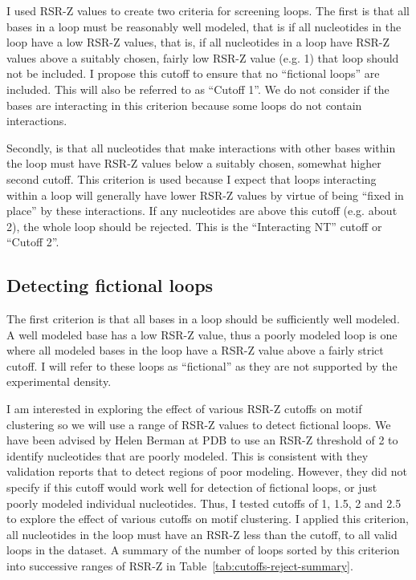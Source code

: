 I used RSR-Z values to create two criteria for screening loops. The first is
that all bases in a loop must be reasonably well modeled, that is if all
nucleotides in the loop have a low RSR-Z values, that is, if all nucleotides in
a loop have RSR-Z values above a suitably chosen, fairly low RSR-Z value (e.g.
1) that loop should not be included. I propose this cutoff to ensure that no
``fictional loops'' are included. This will also be referred to as ``Cutoff 1''.
We do not consider if the bases are interacting in this criterion because some
loops do not contain interactions. 

Secondly, is that all nucleotides that make interactions with other bases within
the loop must have RSR-Z values below a suitably chosen, somewhat higher second
cutoff. This criterion is used because I expect that loops interacting within a
loop will generally have lower RSR-Z values by virtue of being ``fixed in place''
by these interactions. If any nucleotides are above this cutoff (e.g. about 2),
the whole loop should be rejected. This is the ``Interacting NT'' cutoff or
``Cutoff 2''.

\subsection{Detecting fictional loops}

The first criterion is that all bases in a loop should be sufficiently well
modeled. A well modeled base has a low RSR-Z value, thus a poorly modeled loop is
one where all modeled bases in the loop have a RSR-Z value above a fairly strict
cutoff. I will refer to these loops as ``fictional'' as they are not supported
by the experimental density. 

I am interested in exploring the effect of various RSR-Z cutoffs on motif
clustering so we will use a range of RSR-Z values to detect fictional loops. We
have been advised by Helen Berman at PDB to use an RSR-Z threshold of 2 to
identify nucleotides that are poorly modeled. This is consistent with they
validation reports that to detect regions of poor modeling. However, they did
not specify if this cutoff would work well for detection of fictional loops, or
just poorly modeled individual nucleotides. Thus, I tested cutoffs of 1, 1.5, 2 and
2.5 to explore the effect of various cutoffs on motif clustering. I applied this
criterion, all nucleotides in the loop must have an RSR-Z less than the cutoff,
to all valid loops in the dataset. A summary of the number of loops sorted by
this criterion into successive ranges of RSR-Z in
Table~\ref{tab:cutoffs-reject-summary}.

